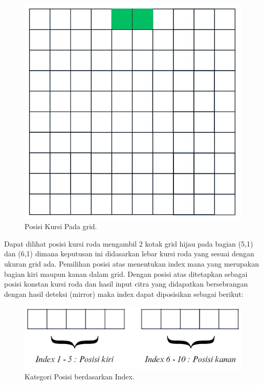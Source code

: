 \begin{figure}[H]
  \centering
  \includegraphics[scale=0.35]{gambar/gridkamera.jpg}
  \caption{Posisi Kursi Pada grid.}
  \label{fig:Posisi}
\end{figure}

Dapat dilihat posisi kursi roda mengambil 2 kotak grid hijau pada bagian (5,1) dan (6,1) dimana keputusan ini didasarkan lebar kursi roda yang sesuai dengan ukuran grid ada. Pemilihan posisi atas menentukan index mana yang merupakan bagian kiri maupun kanan dalam grid. Dengan posisi atas ditetapkan sebagai posisi konstan kursi roda dan hasil input citra yang didapatkan bersebrangan dengan hasil deteksi (mirror) maka index dapat diposisikan sebagai berikut:

\begin{figure}[H]
  \centering
  \includegraphics[scale=0.3]{gambar/posisi index sebenarnya.png}
  \caption{Kategori Posisi berdasarkan Index.}
  \label{fig:Kategori Posisi berdasarkan index.}
\end{figure}

